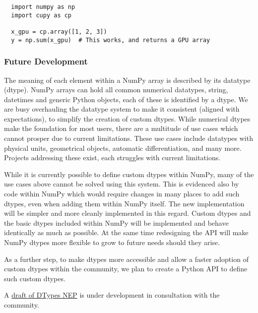 \documentclass[fleqn,10pt]{wlscirep}
\begin{document}
\begin{lstlisting}
  import numpy as np
  import cupy as cp

  x_gpu = cp.array([1, 2, 3])
  y = np.sum(x_gpu)  # This works, and returns a GPU array
\end{lstlisting}

\subsubsection*{Future Development}


The meaning of each element within a NumPy array is described by its datatype
(dtype). NumPy arrays can hold all common numerical datatypes, string, datetimes
and generic Python objects, each of these is identified by a dtype.
We are busy overhauling the datatype system to make it consistent (aligned with
expectations), to simplify the creation of custom dtypes.
While numerical dtypes make the foundation for most users, there are
a multitude of use cases which cannot prosper due to current limitations.
These use cases include datatypes with physical units\cite{astropy,Goldbaum2018,pint},
geometrical objects\cite{pygeos}, automatic differentiation\cite{pyadolc}, and many more.
Projects addressing these exist, each struggles with current
limitations.  %

While it is currently possible to define custom dtypes within NumPy, many of the
use cases above cannot be solved using this system.
This is evidenced also by code within NumPy which would require changes
in many places to add such dtypes, even when adding them within NumPy itself.
The new implementation will be simpler and more cleanly implemented in
this regard.
Custom dtypes and the basic dtypes included within NumPy will be implemented
and behave identically as much as possible.
At the same time redesigning the API will make NumPy dtypes more flexible to grow
to future needs should they arise.

As a further step, to make dtypes more accessible and allow a faster adoption of
custom dtypes within the community, we plan to create a Python API to
define such custom dtypes.

A \href{https://github.com/numpy/numpy/pull/14422}{draft of DTypes NEP}
is under development in consultation with the community.
\end{document}
